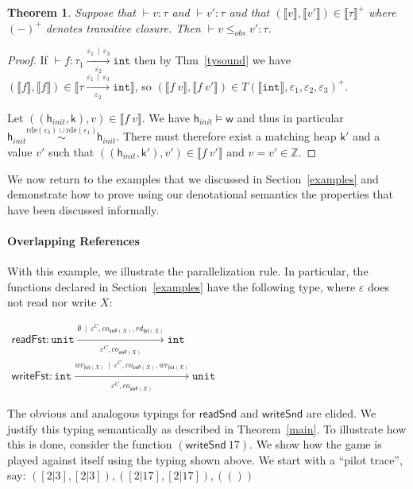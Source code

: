 \documentclass[nocopyrightspace,preprint]{sigplanconf}
\newcommand{\keywd}[1]{\mathtt{#1}}
\newcommand{\myeffto}[3]{\xrightarrow[#2]{#1\,\mid\, #3}}
\newcommand{\inttype}{\keywd{int}}
\newcommand{\unittype}{\keywd{unit}}
\newcommand{\rdsin}[1]{\mathrm{rds}({#1})}
\newcommand{\eff}{\varepsilon}
\newcommand{\sem}[1]{\ensuremath{\llbracket {#1} \rrbracket}}
\newcommand{\rEff}[1]{\ensuremath{\mathit{rd}_{#1}}}
\newcommand{\cEff}[1]{\ensuremath{\mathit{co}_{#1}}}
\newcommand{\wEff}[1]{\ensuremath{\mathit{wr}_{#1}}}
\newtheorem{theorem}{Theorem}[section]
\newcommand{\locHi}{\ensuremath{\mathfrak{snd}}\xspace}
\newcommand{\locLo}{\ensuremath{\mathfrak{fst}}\xspace}
\newcommand{\cloc}{\ensuremath{X}\xspace}
\newcommand\w{\ensuremath{\mathsf{w}}\xspace}
\newcommand\hinit{\ensuremath{\mathsf{h}_{\mathit{init}}}\xspace}
\renewcommand\k{\ensuremath{\mathsf{k}}\xspace}
\newcommand\rloc[3]{\ensuremath{#1 \stackrel{#3}{\sim} #2}}
\begin{document}
\begin{theorem}
Suppose that $\vdash v:\tau$ and $\vdash v':\tau$ and that $(\sem{v},\sem{v'})\in\sem{\tau}^+$ where $(-)^+$ denotes transitive closure. 
Then $\vdash v\leq_{\mathit{obs}} v':\tau$. 
\end{theorem}
\begin{proof}
If $\vdash f:\tau_1\myeffto{\eff_1}{\eff_2}{\eff_3}\inttype$ then by Thm~\ref{tysound} we have $(\sem{f},\sem{f})\in \sem{\tau\myeffto{\eff_1}{\eff_2}{\eff_3} \inttype}$, so 
$(\sem{f\ v},\sem{f\ v'})\in T(\sem{\inttype},\eff_1,\eff_2,\eff_3)^+$. 

Let $((\hinit,\k),v)\in \sem{f\ v}$. We have $\hinit\models\w$ and
thus in particular
$\rloc{\hinit}{\hinit}{{\rdsin{\eff_3}\cup\rdsin{\eff_1}}}$. There must
therefore exist a matching heap $\k'$ and a value $v'$ such that
$((\hinit,\k'),v')\in \sem{f\ v'}$ and $v=v'\in\mathbb{Z}$.
\end{proof}











We now return to the examples that we discussed in Section~\ref{examples} and demonstrate how to prove using our denotational semantics the properties that have been discussed informally.

\paragraph{Overlapping References}
With this example, we illustrate the parallelization rule. In
particular, the functions declared in Section~\ref{examples} have the
following type, where $\eff$ does not read nor write $\cloc$:

\begin{small}
\(
\begin{array}{l}
\mathsf{readFst} : \unittype \myeffto{\emptyset}
            {\eff^C, \cEff{\locHi(\cloc)}}
            {\eff^C, \cEff{\locHi(\cloc)}, \rEff{\locLo(\cloc)}} \inttype\\
\mathsf{writeFst} : \inttype \myeffto{\wEff{\locLo(\cloc)}}
            {\eff^C, \cEff{\locHi(\cloc)}}
            {\eff^C, \cEff{\locHi(\cloc)}, \wEff{\locLo(\cloc)}} \unittype 
\end{array}\)
\end{small}

The obvious and analogous typings for $\mathsf{readSnd}$ and
$\mathsf{writeSnd}$ are elided.  We justify this typing semantically
as described in Theorem~\ref{main}. To illustrate how this is done,
consider the function $(\mathsf{writeSnd}~17)$. We show how the game
is played against itself using the typing shown above. We start with a
``pilot trace'', say:
\(
([2|3],[2|3]),([2|17],[2|17]),(())
\)
\end{document}
